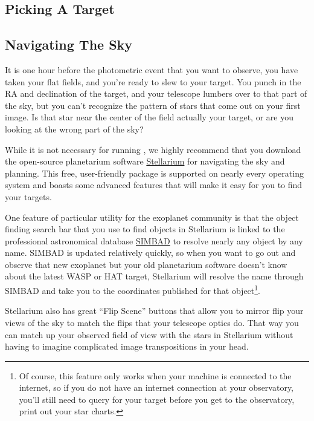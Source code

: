 \documentclass{article}
\begin{document}
\subsection{Picking A Target}



\subsection{Navigating The Sky} \label{sec:nav}

It is one hour before the photometric event that you want to observe, you have taken your flat fields, and you're ready to slew to your target. You punch in the RA and declination of the target, and your telescope lumbers over to that part of the sky, but you can't recognize the pattern of stars that come out on your first image. Is that star near the center of the field actually your target, or are you looking at the wrong part of the sky? 

While it is not necessary for running \oscaar, we highly recommend that you download the open-source planetarium software \href{http://www.stellarium.org/}{Stellarium} for navigating the sky and planning. This free, user-friendly package is supported on nearly every operating system and boasts some advanced features that will make it easy for you to find your targets. 

One feature of particular utility for the exoplanet community is that the object finding search bar that you use to find objects in Stellarium is linked to the professional astronomical database \href{http://simbad.harvard.edu/simbad/}{SIMBAD} to resolve nearly any object by any name. SIMBAD is updated relatively quickly, so when you want to go out and observe that new exoplanet but your old planetarium software doesn't know about the latest WASP or HAT target, Stellarium will resolve the name through SIMBAD and take you to the coordinates published for that object\footnote{Of course, this feature only works when your machine is connected to the internet, so if you do not have an internet connection at your observatory, you'll still need to query for your target before you get to the observatory, print out your star charts.}.

Stellarium also has great ``Flip Scene'' buttons that allow you to mirror flip your views of the sky to match the flips that your telescope optics do. That way you can match up your observed field of view with the stars in Stellarium without having to imagine complicated image transpositions in your head.
\end{document}
